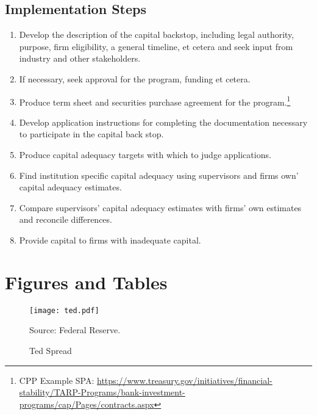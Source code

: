 \documentclass[12pt]{article}
\begin{document}
\subsection{Implementation Steps}

\begin{enumerate}

\item Develop the description of the capital backstop, including legal authority, purpose, firm eligibility, a general timeline, et cetera and seek input from industry and other stakeholders.
\item If necessary, seek approval for the program, funding et cetera.
\item Produce term sheet and securities purchase agreement for the program.\footnote{CPP Example SPA: \newline \url{https://www.treasury.gov/initiatives/financial-stability/TARP-Programs/bank-investment-programs/cap/Pages/contracts.aspx}}
\item Develop application instructions for completing the documentation necessary to participate in the capital back stop.
\item Produce capital adequacy targets with which to judge applications.
\item Find institution specific capital adequacy using supervisors and firms own' capital adequacy estimates. 
\item Compare supervisors' capital adequacy estimates with firms' own estimates and reconcile differences.
\item Provide capital to firms with inadequate capital. 

\end{enumerate}

\section{Figures and Tables}
\begin{figure}[h]
\caption{Ted Spread}\label{ted}
\centering
\texttt{[image: ted.pdf]}
\raggedright
\footnotesize Source: Federal Reserve.
\end{figure}
\end{document}
